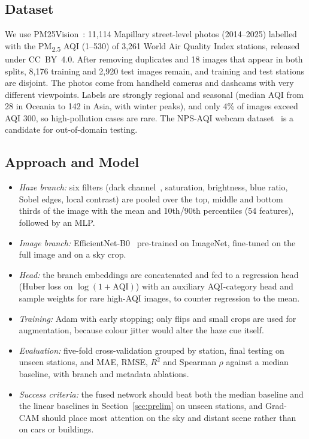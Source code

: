 \documentclass[conference]{IEEEtran}
\newcommand{\pmtwofive}{PM\textsubscript{2.5}}
\begin{document}
\subsection{Dataset}
We use PM25Vision~\cite{pm25vision}: 11,114 Mapillary street-level photos (2014--2025) labelled with the \pmtwofive{} AQI (1--530) of 3,261 World Air Quality Index stations, released under CC~BY~4.0. After removing duplicates and 18 images that appear in both splits, 8,176 training and 2,920 test images remain, and training and test stations are disjoint. The photos come from handheld cameras and dashcams with very different viewpoints. Labels are strongly regional and seasonal (median AQI from 28 in Oceania to 142 in Asia, with winter peaks), and only 4\% of images exceed AQI 300, so high-pollution cases are rare. The NPS-AQI webcam dataset~\cite{byler2025} is a candidate for out-of-domain testing.

\subsection{Approach and Model}
\begin{itemize}
\item \textit{Haze branch:} six filters (dark channel~\cite{he2011}, saturation, brightness, blue ratio, Sobel edges, local contrast) are pooled over the top, middle and bottom thirds of the image with the mean and 10th/90th percentiles (54 features), followed by an MLP.
\item \textit{Image branch:} EfficientNet-B0~\cite{tan2019} pre-trained on ImageNet, fine-tuned on the full image and on a sky crop.
\item \textit{Head:} the branch embeddings are concatenated and fed to a regression head (Huber loss on $\log(1+\mathrm{AQI})$) with an auxiliary AQI-category head and sample weights for rare high-AQI images, to counter regression to the mean.
\item \textit{Training:} Adam with early stopping; only flips and small crops are used for augmentation, because colour jitter would alter the haze cue itself.
\item \textit{Evaluation:} five-fold cross-validation grouped by station, final testing on unseen stations, and MAE, RMSE, $R^2$ and Spearman $\rho$ against a median baseline, with branch and metadata ablations.
\item \textit{Success criteria:} the fused network should beat both the median baseline and the linear baselines in Section~\ref{sec:prelim} on unseen stations, and Grad-CAM should place most attention on the sky and distant scene rather than on cars or buildings.
\end{itemize}
\end{document}
